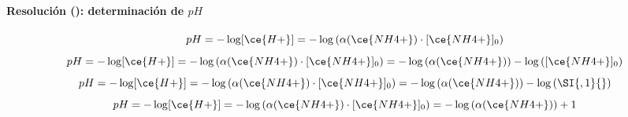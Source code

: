 \begin{frame}
    \frametitle{\ejerciciocmd}
    \framesubtitle{Resolución (): determinación de $pH$}
    \begin{overprint}
            $$
                pH = -\log[\ce{H+}] = -\log\left(\alpha(\ce{NH4+})\cdot[\ce{NH4+}]_0\right)
            $$
            $$
                pH = -\log[\ce{H+}] = -\log\left(\alpha(\ce{NH4+})\cdot[\ce{NH4+}]_0\right) = -\log\left(\alpha(\ce{NH4+})\right)-\log\left([\ce{NH4+}]_0\right)
            $$
            $$
                pH = -\log[\ce{H+}] = -\log\left(\alpha(\ce{NH4+})\cdot[\ce{NH4+}]_0\right) = -\log\left(\alpha(\ce{NH4+})\right)-\log\left(\SI{,1}{}\right)
            $$
            $$
                pH = -\log[\ce{H+}] = -\log\left(\alpha(\ce{NH4+})\cdot[\ce{NH4+}]_0\right) = -\log\left(\alpha(\ce{NH4+})\right)+1
            $$
    \end{overprint}
\end{frame}

